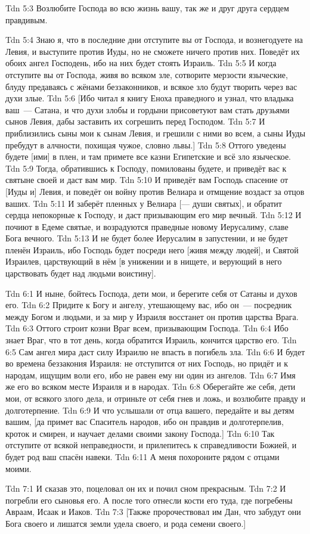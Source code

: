 \vs Tdn 5:3
Возлюбите Господа во всю жизнь вашу,
так же и друг друга сердцем правдивым.

\vs Tdn 5:4
Знаю я, что в последние дни отступите вы от Господа,
и вознегодуете на Левия, и выступите против Иуды,
но не сможете ничего против них.
Поведёт их обоих ангел Господень,
ибо на них будет стоять Израиль.
\vs Tdn 5:5
И когда отступите вы от Господа, живя во всяком зле,
сотворите мерзости языческие,
блуду предаваясь с жёнами беззаконников,
и всякое зло будут творить через вас духи злые.
\vs Tdn 5:6
[Ибо читал я книгу Еноха праведного и узнал,
что владыка ваш~--- Сатана,
и что духи злобы и гордыни присоветуют вам стать друзьями сынов Левия,
дабы заставить их согрешить перед Господом.
\vs Tdn 5:7
И приблизились сыны мои к сынам Левия,
и грешили с ними во всем, а сыны Иуды пребудут в алчности,
похищая чужое, словно львы.]
\vs Tdn 5:8
Оттого уведены будете [ими] в плен,
и там примете все казни Египетские и всё зло языческое.
\vs Tdn 5:9
Тогда, обратившись к Господу, помилованы будете,
и приведёт вас к святыне своей и даст вам мир.
\vs Tdn 5:10
И приведёт вам Господь спасение от [Иуды и] Левия,
и поведёт он войну против Велиара и отмщение воздаст за отцов ваших.
\vs Tdn 5:11
И заберёт пленных у Велиара [--- души святых],
и обратит сердца непокорные к Господу,
и даст призывающим его мир вечный.
\vs Tdn 5:12
И почиют в Едеме святые, и возрадуются праведные новому Иерусалиму,
славе Бога вечного.
\vs Tdn 5:13
И не будет более Иерусалим в запустении,
и не будет пленён Израиль, ибо Господь будет посреди него
[живя между людей], и Святой Израилев, царствующий в нём
[в унижении и в нищете, и верующий в него царствовать
будет над людьми воистину].

\vs Tdn 6:1
И ныне, бойтесь Господа, дети мои, и берегите себя от Сатаны и духов его.
\vs Tdn 6:2
Придите к Богу и ангелу, утешающему вас,
ибо он~--- посредник между Богом и людьми,
и за мир у Израиля восстанет он против царства Врага.
\vs Tdn 6:3
Оттого строит козни Враг всем, призывающим Господа.
\vs Tdn 6:4
Ибо знает Враг, что в тот день, когда обратится Израиль,
кончится царство его.
\vs Tdn 6:5
Сам ангел мира даст силу Израилю не впасть в погибель зла.
\vs Tdn 6:6
И будет во времена беззакония Израиля:
не отступится от них Господь, но придёт и к народам,
ищущим воли его, ибо не равен ему ни один из ангелов.
\vs Tdn 6:7
Имя же его во всяком месте Израиля и в народах.
\vs Tdn 6:8
Оберегайте же себя, дети мои, от всякого злого дела,
и отриньте от себя гнев и ложь, и возлюбите правду и долготерпение.
\vs Tdn 6:9
И что услышали от отца вашего, передайте и вы детям вашим,
[да примет вас Спаситель народов, ибо он правдив и долготерпелив,
кроток и смирен, и научает делами своими закону Господа.]
\vs Tdn 6:10
Так отступите от всякой неправедности, и прилепитесь к справедливости
Божией, и будет род ваш спасён навеки.
\vs Tdn 6:11
А меня похороните рядом с отцами моими.

\vs Tdn 7:1
И сказав это, поцеловал он их и почил сном прекрасным.
\vs Tdn 7:2
И погребли его сыновья его.
А после того отнесли кости его туда,
где погребены Авраам, Исаак и Иаков.
\vs Tdn 7:3
[Также пророчествовал им Дан,
что забудут они Бога своего и лишатся земли удела своего,
и рода семени своего.]

